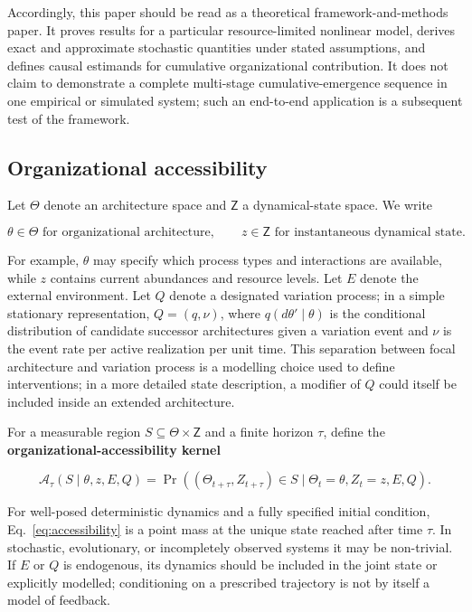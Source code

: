 \documentclass[11pt,a4paper]{article}
\begin{document}
Accordingly, this paper should be read as a theoretical framework-and-methods paper. It proves results for a particular resource-limited nonlinear model, derives exact and approximate stochastic quantities under stated assumptions, and defines causal estimands for cumulative organizational contribution. It does not claim to demonstrate a complete multi-stage cumulative-emergence sequence in one empirical or simulated system; such an end-to-end application is a subsequent test of the framework.

\subsection{Organizational accessibility}

Let $\mathsf\Theta$ denote an architecture space and $\mathsf Z$ a dynamical-state space. We write

\[
\theta\in\mathsf\Theta \text{ for organizational architecture},
\qquad
z\in\mathsf Z \text{ for instantaneous dynamical state}.
\]

For example, $\theta$ may specify which process types and interactions are available, while $z$ contains current abundances and resource levels. Let $E$ denote the external environment. Let $Q$ denote a designated variation process; in a simple stationary representation, $Q=(q,\nu)$, where $q(d\theta'\mid\theta)$ is the conditional distribution of candidate successor architectures given a variation event and $\nu$ is the event rate per active realization per unit time. This separation between focal architecture and variation process is a modelling choice used to define interventions; in a more detailed state description, a modifier of $Q$ could itself be included inside an extended architecture.

For a measurable region $S\subseteq\mathsf\Theta\times\mathsf Z$ and a finite horizon $\tau$, define the \textbf{organizational-accessibility kernel}

\begin{equation}
\boxed{
\mathcal A_\tau(S\mid\theta,z,E,Q)
=
\Pr\!\left(
(\Theta_{t+\tau},Z_{t+\tau})\in S
\mid
\Theta_t=\theta,Z_t=z,E,Q
\right).
}
\label{eq:accessibility}
\end{equation}

For well-posed deterministic dynamics and a fully specified initial condition, Eq.~\eqref{eq:accessibility} is a point mass at the unique state reached after time $\tau$. In stochastic, evolutionary, or incompletely observed systems it may be non-trivial. If $E$ or $Q$ is endogenous, its dynamics should be included in the joint state or explicitly modelled; conditioning on a prescribed trajectory is not by itself a model of feedback.
\end{document}
